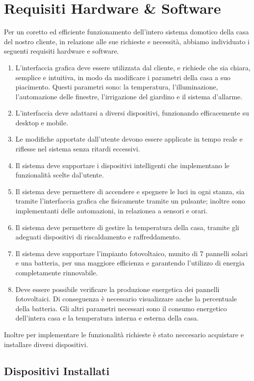 \documentclass[italian, 12pt, a4paper]{article}
\begin{document}
\section{Requisiti Hardware \& Software}\label{sec:requisiti}
Per un coretto ed efficiente funzionamento dell'intero sistema domotico della casa del nostro cliente, in relazione alle sue richieste e necessità, abbiamo individuato i seguenti requisiti hardware e software.
\begin{enumerate}
    \item L'interfaccia grafica deve essere utilizzata dal cliente, e richiede che sia chiara, semplice e intuitiva, in modo da modificare i parametri della casa a suo piacimento. Questi parametri sono: la temperatura, l'illuminazione, l'automazione delle finestre, l'irrigazione del giardino e il sistema d'allarme.
    \item L’interfaccia deve adattarsi a diversi dispositivi, funzionando efficacemente su desktop e mobile.
    \item Le modifiche apportate dall’utente devono essere applicate in tempo reale e riflesse nel sistema senza ritardi eccessivi.
    \item Il sistema deve supportare i dispositivi intelligenti che implementano le funzionalità scelte dal'utente.
    \item Il sistema deve permettere di accendere e spegnere le luci in ogni stanza, sia tramite l'interfaccia grafica che fisicamente tramite un pulsante; inoltre sono implementanti delle automazioni, in relazionea a sensori e orari.
    \item Il sistema deve permettere di gestire la temperatura della casa, tramite gli adeguati dispositivi di riscaldamento e raffreddamento.
    \item Il sistema deve supportare l'impianto fotovoltaico, munito di 7 pannelli solari e una batteria, per una maggiore efficienza e garantendo l’utilizzo di energia completamente rinnovabile.
    \item Deve essere possibile verificare la produzione energetica dei pannelli fotovoltaici. Di conseguenza è necessario visualizzare anche la percentuale della batteria. Gli altri parametri necessari sono il consumo energetico dell’intera casa e la temperatura interna e esterna della casa.
\end{enumerate}
\clearpage
Inoltre per implementare le funzionalità richieste è stato neccesario acquistare e installare diversi dispositivi. 
\subsection{Dispositivi Installati}
\end{document}

